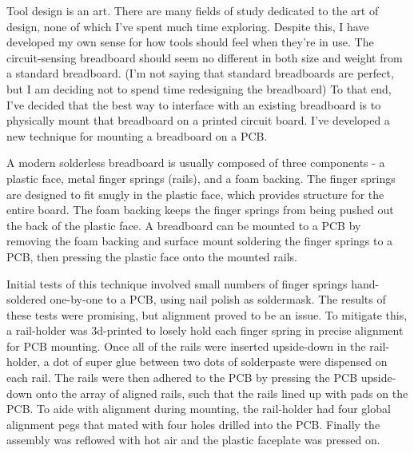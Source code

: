 \documentclass[11pt, a4paper]{article}
\begin{document}
Tool design is an art.
There are many fields of study dedicated to the art of design, none of which I've spent much time exploring.
Despite this, I have developed my own sense for how tools should feel when they're in use.
The circuit-sensing breadboard should seem no different in both size and weight from a standard breadboard.
(I'm not saying that standard breadboards are perfect, but I am deciding not to spend time redesigning the breadboard)
To that end, I've decided that the best way to interface with an existing breadboard is to physically mount that breadboard on a printed circuit board.
I've developed a new technique for mounting a breadboard on a PCB.

A modern solderless breadboard is usually composed of three components - a plastic face, metal finger springs (rails), and a foam backing.
The finger springs are designed to fit snugly in the plastic face, which provides structure for the entire board.
The foam backing keeps the finger springs from being pushed out the back of the plastic face.
A breadboard can be mounted to a PCB by removing the foam backing and surface mount soldering the finger springs to a PCB, then pressing the plastic face onto the mounted rails.

Initial tests of this technique involved small numbers of finger springs hand-soldered one-by-one to a PCB, using nail polish as soldermask.
The results of these tests were promising, but alignment proved to be an issue.
To mitigate this, a rail-holder was 3d-printed to losely hold each finger spring in precise alignment for PCB mounting.
Once all of the rails were inserted upside-down in the rail-holder, a dot of super glue between two dots of solderpaste were dispensed on each rail.
The rails were then adhered to the PCB by pressing the PCB upside-down onto the array of aligned rails, such that the rails lined up with pads on the PCB.
To aide with alignment during mounting, the rail-holder had four global alignment pegs that mated with four holes drilled into the PCB.
Finally the assembly was reflowed with hot air and the plastic faceplate was pressed on.
\end{document}
